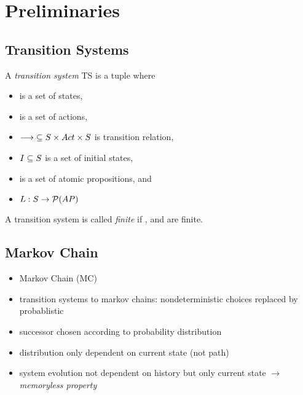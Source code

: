 \documentclass[preview]{standalone}
\begin{document}
	
	\section{Preliminaries}
	
	\subsection{Transition Systems}
	
	
	\begin{definition}
		A \emph{transition system} TS is a tuple \transitionsystem where
		\begin{itemize}
			\item \states is a set of states,
			\item \actions is a set of actions,
			\item ${\longrightarrow} \subseteq {S} \times {Act} \times {S}$ is transition relation,
			\item ${I} \subseteq {S}$ is a set of initial states,
			\item \atomicprops is a set of atomic propositions, and
			\item ${L} : {S} \to {\mathcal{P}(\ensuremath{{AP}})}$
		\end{itemize}
		
		A transition system is called \emph{finite} if \states, \atomicprops and  are finite.
	\end{definition}
	
	
	\subsection{Markov Chain}
	
	\begin{itemize}
		\item Markov Chain (MC)
		\item transition systems to markov chains: nondeterministic choices replaced by probablistic
		\item successor chosen according to probability distribution
		\item distribution only dependent on current state \state (not path)
		\item system evolution not dependent on history but only current state $\to$ \emph{memoryless property}
	\end{itemize}
	
\end{document}
